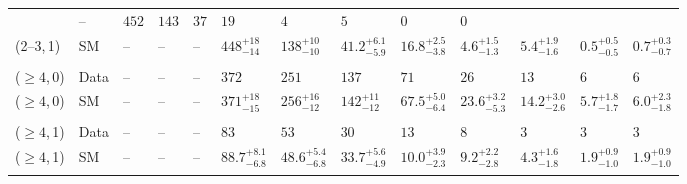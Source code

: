 \begin{table}[h!]
{\begin{tabular}{ lllllllllllll }
               & --                 
               & $452$
               & $143$
               & $37$
               & $19$
               & $4$
               & $5$
               & $0$
               & $0$                                                          \\
               (2--3,\,1)
               & SM     
               & --                         
               & --                         
               & --      
               & $448^{+18}_{-14}$
               & $138^{+10}_{-10}$
               & $41.2^{+6.1}_{-5.9}$
               & $16.8^{+2.5}_{-3.8}$
               & $4.6^{+1.5}_{-1.3}$
               & $5.4^{+1.9}_{-1.6}$
               & $0.5^{+0.5}_{-0.5}$
               & $0.7^{+0.3}_{-0.7}$                                          \\\\[-2ex]
               ($\geq4$,\,0)
               & Data
               & --           
               & --  
               & --    
               & $372$
               & $251$
               & $137$
               & $71$
               & $26$
               & $13$
               & $6$
               & $6$                                                          \\
               ($\geq4$,\,0)
               & SM
               & --                          
               & --                          
               & --        
               & $371^{+18}_{-15}$
               & $256^{+16}_{-12}$
               & $142^{+11}_{-12}$
               & $67.5^{+5.0}_{-6.4}$
               & $23.6^{+3.2}_{-5.3}$
               & $14.2^{+3.0}_{-2.6}$
               & $5.7^{+1.8}_{-1.7}$
               & $6.0^{+2.3}_{-1.8}$                                          \\\\[-2ex]
               ($\geq4$,\,1)
               & Data
               & --       
               & --       
               & --           
               & $83$
               & $53$
               & $30$
               & $13$
               & $8$
               & $3$
               & $3$
               & $3$                                                          \\
               ($\geq4$,\,1)
               & SM
               & --                    
               & --        
               & --        
               & $88.7^{+8.1}_{-6.8}$
               & $48.6^{+5.4}_{-6.8}$
               & $33.7^{+5.6}_{-4.9}$
               & $10.0^{+3.9}_{-2.3}$
               & $9.2^{+2.2}_{-2.8}$
               & $4.3^{+1.6}_{-1.8}$
               & $1.9^{+0.9}_{-1.0}$
               & $1.9^{+0.9}_{-1.0}$                                          \\\\[-3ex]
      \hline
   \end{tabular}
 }
\end{table}

